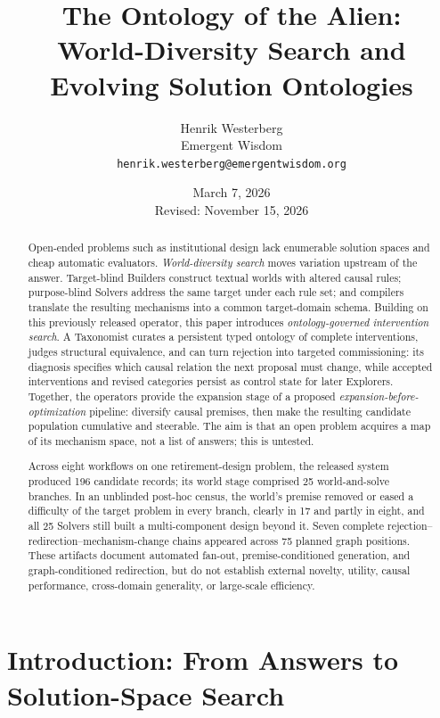 \documentclass[11pt,a4paper]{article}
\title{The Ontology of the Alien:\\World-Diversity Search and Evolving Solution Ontologies}
\author{Henrik Westerberg\\Emergent Wisdom\\\texttt{henrik.westerberg@emergentwisdom.org}}
\date{March 7, 2026\\\small Revised: November 15, 2026}
\begin{document}
\maketitle

\begin{abstract}
Open-ended problems such as institutional design lack enumerable solution spaces and cheap automatic evaluators. \emph{World-diversity search} moves variation upstream of the answer. Target-blind Builders construct textual worlds with altered causal rules; purpose-blind Solvers address the same target under each rule set; and compilers translate the resulting mechanisms into a common target-domain schema. Building on this previously released operator, this paper introduces \emph{ontology-governed intervention search}. A Taxonomist curates a persistent typed ontology of complete interventions, judges structural equivalence, and can turn rejection into targeted commissioning: its diagnosis specifies which causal relation the next proposal must change, while accepted interventions and revised categories persist as control state for later Explorers. Together, the operators provide the expansion stage of a proposed \emph{expansion-before-optimization} pipeline: diversify causal premises, then make the resulting candidate population cumulative and steerable. The aim is that an open problem acquires a map of its mechanism space, not a list of answers; this is untested.

Across eight workflows on one retirement-design problem, the released system produced 196 candidate records; its world stage comprised 25 world-and-solve branches. In an unblinded post-hoc census, the world's premise removed or eased a difficulty of the target problem in every branch, clearly in 17 and partly in eight, and all 25 Solvers still built a multi-component design beyond it. Seven complete rejection--redirection--mechanism-change chains appeared across 75 planned graph positions. These artifacts document automated fan-out, premise-conditioned generation, and graph-conditioned redirection, but do not establish external novelty, utility, causal performance, cross-domain generality, or large-scale efficiency.
\end{abstract}


\section{Introduction: From Answers to Solution-Space Search}
\end{document}
